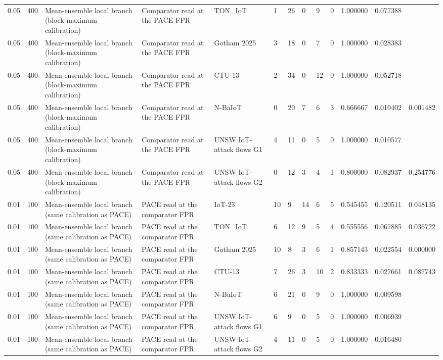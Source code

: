 \begin{tabular}{lllllllllllll}
0.05 & 400 & Mean-ensemble local branch (block-maximum calibration) & Comparator read at the PACE FPR & TON\_IoT & 1 & 26 & 0 & 9 & 0 & 1.000000 & 0.077388 &  \\
0.05 & 400 & Mean-ensemble local branch (block-maximum calibration) & Comparator read at the PACE FPR & Gotham 2025 & 3 & 18 & 0 & 7 & 0 & 1.000000 & 0.028383 &  \\
0.05 & 400 & Mean-ensemble local branch (block-maximum calibration) & Comparator read at the PACE FPR & CTU-13 & 2 & 34 & 0 & 12 & 0 & 1.000000 & 0.052718 &  \\
0.05 & 400 & Mean-ensemble local branch (block-maximum calibration) & Comparator read at the PACE FPR & N-BaIoT & 0 & 20 & 7 & 6 & 3 & 0.666667 & 0.010402 & 0.001482 \\
0.05 & 400 & Mean-ensemble local branch (block-maximum calibration) & Comparator read at the PACE FPR & UNSW IoT-attack flows G1 & 4 & 11 & 0 & 5 & 0 & 1.000000 & 0.010577 &  \\
0.05 & 400 & Mean-ensemble local branch (block-maximum calibration) & Comparator read at the PACE FPR & UNSW IoT-attack flows G2 & 0 & 12 & 3 & 4 & 1 & 0.800000 & 0.082937 & 0.254776 \\
0.01 & 100 & Mean-ensemble local branch (same calibration as PACE) & PACE read at the comparator FPR & IoT-23 & 10 & 9 & 14 & 6 & 5 & 0.545455 & 0.120511 & 0.048135 \\
0.01 & 100 & Mean-ensemble local branch (same calibration as PACE) & PACE read at the comparator FPR & TON\_IoT & 6 & 12 & 9 & 5 & 4 & 0.555556 & 0.067885 & 0.036722 \\
0.01 & 100 & Mean-ensemble local branch (same calibration as PACE) & PACE read at the comparator FPR & Gotham 2025 & 10 & 8 & 3 & 6 & 1 & 0.857143 & 0.022554 & 0.000000 \\
0.01 & 100 & Mean-ensemble local branch (same calibration as PACE) & PACE read at the comparator FPR & CTU-13 & 7 & 26 & 3 & 10 & 2 & 0.833333 & 0.027661 & 0.087743 \\
0.01 & 100 & Mean-ensemble local branch (same calibration as PACE) & PACE read at the comparator FPR & N-BaIoT & 6 & 21 & 0 & 9 & 0 & 1.000000 & 0.009598 &  \\
0.01 & 100 & Mean-ensemble local branch (same calibration as PACE) & PACE read at the comparator FPR & UNSW IoT-attack flows G1 & 6 & 9 & 0 & 5 & 0 & 1.000000 & 0.006939 &  \\
0.01 & 100 & Mean-ensemble local branch (same calibration as PACE) & PACE read at the comparator FPR & UNSW IoT-attack flows G2 & 4 & 11 & 0 & 5 & 0 & 1.000000 & 0.016480 &  \\

\end{tabular}
